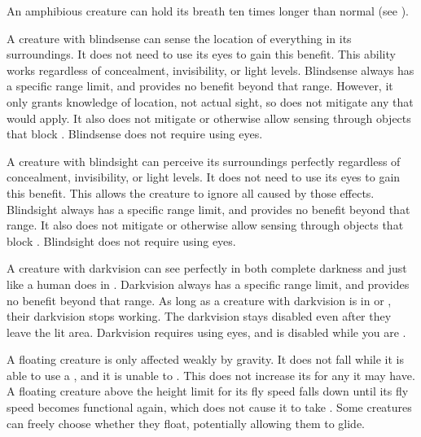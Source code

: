   An amphibious creature can hold its breath ten times longer than normal (see ).

  A creature with blindsense can sense the location of everything in its surroundings.
  It does not need to use its eyes to gain this benefit.
  This ability works regardless of concealment, invisibility, or light levels.
  Blindsense always has a specific range limit, and provides no benefit beyond that range.
  However, it only grants knowledge of location, not actual sight, so does not mitigate any  that would apply.
  It also does not mitigate  or otherwise allow sensing through objects that block .
  Blindsense does not require using eyes.

  A creature with blindsight can perceive its surroundings perfectly regardless of concealment, invisibility, or light levels.
  It does not need to use its eyes to gain this benefit.
  This allows the creature to ignore all  caused by those effects.
  Blindsight always has a specific range limit, and provides no benefit beyond that range.
  It also does not mitigate  or otherwise allow sensing through objects that block .
  Blindsight does not require using eyes.

  A creature with darkvision can see perfectly in both complete darkness and  just like a human does in .
  Darkvision always has a specific range limit, and provides no benefit beyond that range.
  As long as a creature with darkvision is in  or , their darkvision stops working.
  The darkvision  stays disabled even after they leave the lit area.
  Darkvision requires using eyes, and is disabled while you are \dazzled.

  A floating creature is only affected weakly by gravity.
  It does not fall while it is able to use a , and it is unable to .
  This does not increase its  for any  it may have.
  A floating creature above the height limit for its fly speed falls down until its fly speed becomes functional again, which does not cause it to take .
  Some creatures can freely choose whether they float, potentially allowing them to glide.


